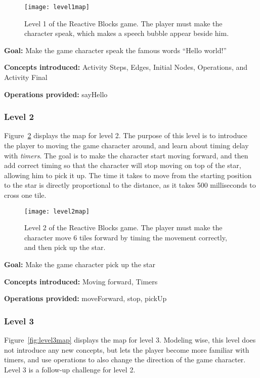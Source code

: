 \begin{figure}[htp]
	\centering
	\texttt{[image: level1map]}
	\caption[Level 1 of the Reactive Blocks game]{Level 1 of the Reactive Blocks game. The player must make the character speak, which makes a speech bubble appear beside him.}
	\label{fig:level1map}
\end{figure}

\noindent
\textbf{Goal:} Make the game character speak the famous words ``Hello world!''

\noindent
\textbf{Concepts introduced:} Activity Steps, Edges, Initial Nodes, Operations, and Activity Final

\noindent
\textbf{Operations provided:} sayHello

\subsubsection{Level 2}
Figure~\ref{fig:level2map} displays the map for level 2. The purpose of this level is to introduce the player to moving the game character around, and learn about timing delay with \emph{timers}. The goal is to make the character start moving forward, and then add correct timing so that the character will stop moving on top of the star, allowing him to pick it up. The time it takes to move from the starting position to the star is directly proportional to the distance, as it takes 500 milliseconds to cross one tile.

\begin{figure}[htp]
	\centering
	\texttt{[image: level2map]}
	\caption[Level 2 of the Reactive Blocks game]{Level 2 of the Reactive Blocks game. The player must make the character move 6 tiles forward by timing the movement correctly, and then pick up the star.}
	\label{fig:level2map}
\end{figure}

\noindent
\textbf{Goal:} Make the game character pick up the star

\noindent
\textbf{Concepts introduced:} Moving forward, Timers

\noindent
\textbf{Operations provided:} moveForward, stop, pickUp

\subsubsection{Level 3}
Figure~\ref{fig:level3map} displays the map for level 3. Modeling wise, this level does not introduce any new concepts, but lets the player become more familiar with timers, and use operations to also change the direction of the game character. Level 3 is a follow-up challenge for level 2.

